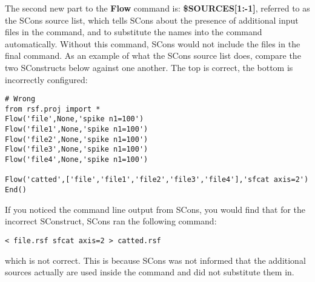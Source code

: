 The second new part to the \textbf{Flow} command is: \textbf{\${SOURCES[1:-1]}}, referred to as the SCons source list, which tells SCons about the presence of additional input files in the command, and to substitute the names into the command automatically.  Without this command, SCons would not include the files in the final command.  As an example of what the SCons source list does, compare the two SConstructs below against one another.  The top is correct, the bottom is incorrectly configured:
\begin{verbatim}
# Wrong
from rsf.proj import *
Flow('file',None,'spike n1=100')
Flow('file1',None,'spike n1=100')
Flow('file2',None,'spike n1=100')
Flow('file3',None,'spike n1=100')
Flow('file4',None,'spike n1=100')

Flow('catted',['file','file1','file2','file3','file4'],'sfcat axis=2')
End()
\end{verbatim}
If you noticed the command line output from SCons, you would find that for the incorrect SConstruct, SCons ran the following command:
\begin{verbatim}
< file.rsf sfcat axis=2 > catted.rsf
\end{verbatim}
which is not correct.  This is because SCons was not informed that the additional sources actually are used inside the command and did not substitute them in.  

